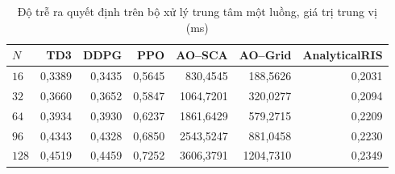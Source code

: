 \begin{table}[htbp]
\centering
\caption{Độ trễ ra quyết định trên bộ xử lý trung tâm một luồng, giá trị trung vị (ms)}
\label{tab:ch4-do-tre}
\footnotesize
\begin{tabular}{@{}lrrrrrr@{}}
\toprule
$N$ & \textbf{TD3} & \textbf{DDPG} & \textbf{PPO} & \textbf{AO--SCA} & \textbf{AO--Grid} & \textbf{AnalyticalRIS} \\
\midrule
$16$ & 0,3389 & 0,3435 & 0,5645 & 830,4545 & 188,5626 & 0,2031 \\
$32$ & 0,3660 & 0,3652 & 0,5847 & 1064,7201 & 320,0277 & 0,2094 \\
$64$ & 0,3934 & 0,3930 & 0,6237 & 1861,6429 & 579,2715 & 0,2209 \\
$96$ & 0,4343 & 0,4328 & 0,6850 & 2543,5247 & 881,0458 & 0,2230 \\
$128$ & 0,4519 & 0,4459 & 0,7252 & 3606,3791 & 1204,7310 & 0,2349 \\
\bottomrule
\end{tabular}
\end{table}
